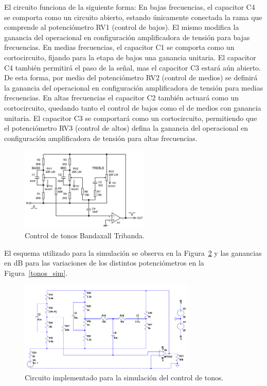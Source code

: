 El circuito funciona de la siguiente forma: 
En bajas frecuencias, el capacitor C4 se comporta como un circuito abierto, estando únicamente conectada la rama que comprende al potenciómetro RV1 (control de bajos). El mismo modifica la ganancia del operacional en configuración amplificadora de tensión para bajas frecuencias.
En medias frecuencias, el capacitor C1 se comporta como un cortocircuito, fijando para la etapa de bajos una ganancia unitaria. El capacitor C4 también permitirá el paso de la señal, mas el capacitor C3 estará aún abierto. De esta forma, por medio del potenciómetro RV2 (control de medios) se definirá la ganancia del operacional en configuración amplificadora de tensión para medias frecuencias.
En altas frecuencias el capacitor C2 también actuará como un cortocircuito, quedando tanto el control de bajos como el de medios con ganancia unitaria. El capacitor C3 se comportará como un cortocircuito, permitiendo que el potenciómetro RV3 (control de altos) defina la ganancia del operacional en configuración amplificadora de tensión para altas frecuencias.

\begin{figure}[H]
\centering
\includegraphics[width=0.55\textwidth]{img/ctrl_tonos.png}
\caption{Control de tonos Bandaxall Tribanda.}
\label{ctrl_tonos} 
\end{figure}

El esquema utilizado para la simulación se observa en la Figura~\ref{ctrl_tonos_cir} y las ganancias en dB para las variaciones de los distintos potenciómetros en la Figura~\ref{tonos_sim}.

\begin{figure}[H]
\centering
\includegraphics[width=0.75\textwidth]{img/ctrl_tonos_cir.png}
\caption{Circuito implementado para la simulación del control de tonos.}
\label{ctrl_tonos_cir} 
\end{figure}

